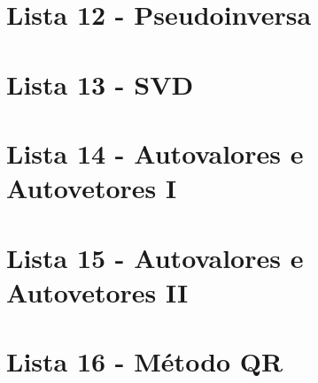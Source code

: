 \documentclass[a4paper,12pt, leqno, answers]{exam}
\begin{document}
\section{Lista 12 - Pseudoinversa}

\newpage
\section{Lista 13 - SVD}

\newpage
\section{Lista 14 - Autovalores e Autovetores I}

\newpage
\section{Lista 15 - Autovalores e Autovetores II}

\newpage
\section{Lista 16 - M\'{e}todo QR}




\end{document}
